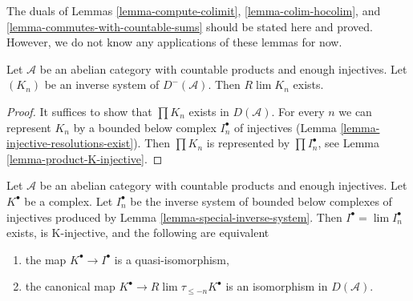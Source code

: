 \noindent
The duals of Lemmas \ref{lemma-compute-colimit},
\ref{lemma-colim-hocolim}, and
\ref{lemma-commutes-with-countable-sums}
should be stated here and proved. However, we do not know any applications
of these lemmas for now.

\begin{lemma}
\label{lemma-inverse-limit-bounded-below}
Let $\mathcal{A}$ be an abelian category with countable products and
enough injectives. Let $(K_n)$ be an inverse system of $D^-(\mathcal{A})$.
Then $R\lim K_n$ exists.
\end{lemma}

\begin{proof}
It suffices to show that $\prod K_n$ exists in $D(\mathcal{A})$.
For every $n$ we can represent $K_n$ by a bounded below complex
$I_n^\bullet$ of injectives (Lemma \ref{lemma-injective-resolutions-exist}).
Then $\prod K_n$ is represented by $\prod I_n^\bullet$, see
Lemma \ref{lemma-product-K-injective}.
\end{proof}

\begin{lemma}
\label{lemma-difficulty-K-injectives}
Let $\mathcal{A}$ be an abelian category with countable products and
enough injectives. Let $K^\bullet$ be a complex. Let $I_n^\bullet$ be
the inverse system of bounded below complexes of injectives produced by
Lemma \ref{lemma-special-inverse-system}. Then
$I^\bullet = \lim I_n^\bullet$ exists, is K-injective, and
the following are equivalent
\begin{enumerate}
\item the map $K^\bullet \to I^\bullet$ is a quasi-isomorphism,
\item the canonical map $K^\bullet \to R\lim \tau_{\leq -n}K^\bullet$
is an isomorphism in $D(\mathcal{A})$.
\end{enumerate}
\end{lemma}

